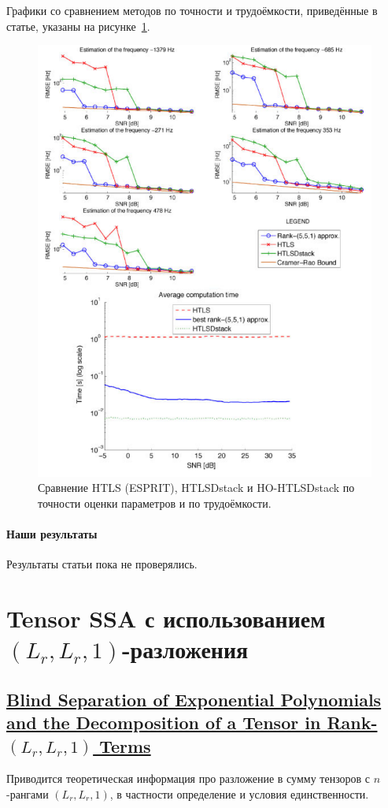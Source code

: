 \documentclass[12pt]{article}
\theoremstyle{plain}
\theoremstyle{definition}
\theoremstyle{remark}
\begin{document}
Графики со сравнением методов по точности и трудоёмкости, приведённые
в статье, указаны на рисунке~\ref{fig:papy2009}.
\begin{figure}[!ht]
  \centering
  \includegraphics[height=0.8\textheight]{papy2009_figures.png}
  \caption{Сравнение HTLS (ESPRIT), HTLSDstack и HO-HTLSDstack по
  точности оценки параметров и по трудоёмкости.}
  \label{fig:papy2009}
\end{figure}

\paragraph{Наши результаты} Результаты статьи пока не проверялись.

\section{Tensor SSA с использованием \texorpdfstring{$(L_r, L_r,
1)$}{(Lr, Lr, 1)}-разложения}
\subsection{\href{https://doi.org/10.1137/100805510}{Blind Separation
    of Exponential Polynomials and the Decom\-position of a Tensor in
Rank-\texorpdfstring{$(L_r, L_r, 1)$}{(Lr, Lr, 1)} Terms}}
Приводится теоретическая информация про разложение в сумму тензоров с
$n$-рангами $(L_r, L_r, 1)$, в частности определение и условия единственности.
\end{document}
